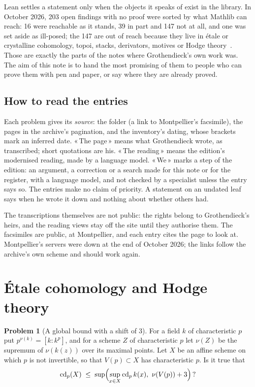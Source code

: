 \documentclass[11pt]{article}
\newcommand{\q}[1]{«\,#1\,»}
\newcommand{\cd}{\operatorname{cd}}
\theoremstyle{definition}
\newtheorem{problem}{Problem}
\theoremstyle{plain}\newtheorem*{proposition}{Proposition}\theoremstyle{definition}
\begin{document}
Lean settles a statement only when the objects it speaks of exist in the library. In October 2026, 203 open findings with no proof were sorted by what Mathlib can reach: 16 were reachable as it stands, 39 in part and 147 not at all, and one was set aside as ill-posed; the 147 are out of reach because they live in étale or crystalline cohomology, topoi, stacks, derivators, motives or Hodge theory~\cite{huacicm}. Those are exactly the parts of the notes where Grothendieck's own work was. The aim of this note is to hand the most promising of them to people who can prove them with pen and paper, or say where they are already proved.

\subsection*{How to read the entries}

Each problem gives its \emph{source}: the folder (a link to Montpellier's facsimile), the pages in the archive's pagination, and the inventory's dating, whose brackets mark an inferred date. \q{The page} means what Grothendieck wrote, as transcribed; short quotations are his. \q{The reading} means the edition's modernised reading, made by a language model. \q{We} marks a step of the edition: an argument, a correction or a search made for this note or for the register, with a language model, and not checked by a specialist unless the entry says so. The entries make no claim of priority. A statement on an undated leaf says when he wrote it down and nothing about whether others had.

The transcriptions themselves are not public: the rights belong to Grothendieck's heirs, and the reading views stay off the site until they authorise them. The facsimiles are public, at Montpellier, and each entry cites the page to look at. Montpellier's servers were down at the end of October 2026; the links follow the archive's own scheme and should work again.

\section{Étale cohomology and Hodge theory}

\begin{problem}[A global bound with a shift of 3]\label{p:cd}
For a field $k$ of characteristic $p$ put $p^{\nu(k)} = [k : k^{p}]$, and for a scheme $Z$ of characteristic $p$ let $\nu(Z)$ be the supremum of $\nu(k(z))$ over its maximal points. Let $X$ be an affine scheme on which $p$ is not invertible, so that $V(p) \subset X$ has characteristic $p$. Is it true that
\[
\cd_p(X) \;\le\; \sup\Bigl(\sup_{x \in X} \cd_p k(x),\ \nu(V(p)) + 3\Bigr)\,?
\]
\end{problem}
\end{document}
